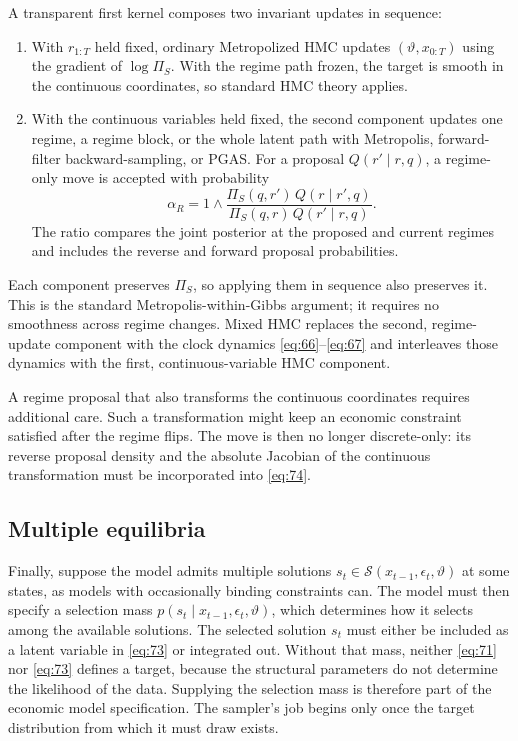 \documentclass[11pt]{article}
\begin{document}
A transparent first kernel composes two invariant updates in sequence:
\begin{enumerate}
\item With $r_{1:T}$ held fixed, ordinary Metropolized HMC updates
      $(\vartheta,x_{0:T})$ using the gradient of
      $\log\Pi_S$. With the regime path frozen, the target is smooth
      in the continuous coordinates, so standard HMC theory applies.
\item With the continuous variables held fixed, the second component updates
      one regime, a regime block, or the whole latent path with Metropolis,
      forward-filter backward-sampling, or PGAS. For a proposal
      $Q(r'\mid r,q)$, a regime-only move is accepted with probability
\begin{equation}\label{eq:74}
 \alpha_R=1\wedge
 \frac{\Pi_S(q,r')\,Q(r\mid r',q)}
      {\Pi_S(q,r)\,Q(r'\mid r,q)}.
\end{equation}
      The ratio compares the joint posterior at the proposed and current
      regimes and includes the reverse and forward proposal probabilities.
\end{enumerate}
Each component preserves $\Pi_S$, so applying them in sequence also
preserves it. This is the standard Metropolis-within-Gibbs argument; it
requires no smoothness across regime changes. Mixed HMC replaces the second,
regime-update component with the clock dynamics
\eqref{eq:66}--\eqref{eq:67} and interleaves those dynamics with the first,
continuous-variable HMC component.

A regime proposal that also transforms the continuous coordinates requires
additional care. Such a transformation might keep an economic constraint
satisfied after the regime flips. The move is then no longer discrete-only:
its reverse proposal density and the absolute Jacobian of the continuous
transformation must be incorporated into \eqref{eq:74}.

\subsection{Multiple equilibria}\label{sec:target-multi}

Finally, suppose the model admits multiple solutions
$s_t\in\mathcal S(x_{t-1},\epsilon_t,\vartheta)$ at some states, as models with occasionally binding
constraints can. The model must then specify a selection mass
$p(s_t\mid x_{t-1},\epsilon_t,\vartheta)$, which determines how it selects among the available
solutions. The selected solution $s_t$ must either be included as
a latent variable in \eqref{eq:73} or integrated out. Without that mass,
neither \eqref{eq:71} nor \eqref{eq:73} defines a target, because the
structural parameters do not determine the likelihood of the data. Supplying
the selection mass is therefore part of the economic model specification.
The sampler's job begins only once the target distribution from which it must
draw exists.
\end{document}
